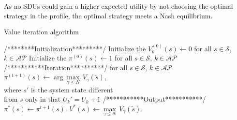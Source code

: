 \documentclass[conference]{IEEEtran}
\begin{document}
\indent As no SDUs could gain a higher expected utility by not choosing the optimal strategy in the profile, the optimal strategy meets a Nash equilibrium.
\begin{algorithm}[t]
\caption{Value iteration algorithm}
\label{alg}
\begin{algorithmic}
\STATE /********Initialization*********/
\STATE Initialize the \(V_k^{(0)}(s)\leftarrow 0\) for all \(s \in \mathcal{S}\), \(k \in \mathcal{AP}\)
\STATE Initialize the \(\pi^{(0)}(s)\leftarrow 1\) for all \(s \in \mathcal{S}\), \(k \in \mathcal{AP}\)
\STATE /***********Iteration**********/
\STATE for all \(s \in \mathcal{S}\), \(k \in \mathcal{AP}\)
\STATE \(\pi^{(t+1)}(s) \leftarrow \arg\underset{\gamma \leq N}{\max}\, V_{\gamma}(\tilde{s})\),\\
            where \(s'\) is the system state different \\
            \qquad\qquad\qquad from \(s\) only in that \(U_k' = U_k + 1\)
\ENDWHILE
\STATE /***********Output***********/
\STATE \( \pi^{\ast}(s) \leftarrow \pi^{t+1}(s)\).
\STATE \( V^{\ast}(s) \leftarrow \underset{\gamma \leq N}{\max}\, V_{\gamma}(\tilde{s})\).
\end{algorithmic}
\end{algorithm}
\end{document}
